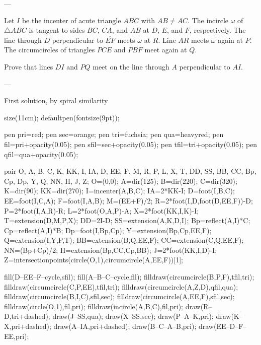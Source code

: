 
---

Let $I$ be the incenter of acute triangle $ABC$ with $AB\neq AC$. The incircle $\omega$ of $\triangle ABC$ is tangent to sides $BC$, $CA$, and $AB$ at $D$, $E$, and $F$, respectively. The line through $D$ perpendicular to $\overline{EF}$ meets $\omega$ at $R$. Line $AR$ meets $\omega$ again at $P$. The circumcircles of triangles $PCE$ and $PBF$ meet again at $Q$.

Prove that lines $DI$ and $PQ$ meet on the line through $A$ perpendicular to $AI$.

---

\begin{customenv}{First solution, by spiral similarity}\
    \begin{center}
        \begin{asy}
            size(11cm);
            defaultpen(fontsize(9pt));

            pen pri=red;
            pen sec=orange;
            pen tri=fuchsia;
            pen qua=heavyred;
            pen fil=pri+opacity(0.05);
            pen sfil=sec+opacity(0.05);
            pen tfil=tri+opacity(0.05);
            pen qfil=qua+opacity(0.05);

            pair O, A, B, C, K, KK, I, IA, D, EE, F, M, R, P, L, X, T, DD, SS, BB, CC, Bp, Cp, Dp, Y, Q, NN, H, J, Z;
            O=(0,0);
            A=dir(125);
            B=dir(220);
            C=dir(320);
            K=dir(90);
            KK=dir(270);
            I=incenter(A,B,C);
            IA=2*KK-I;
            D=foot(I,B,C);
            EE=foot(I,C,A);
            F=foot(I,A,B);
            M=(EE+F)/2;
            R=2*foot(I,D,foot(D,EE,F))-D;
            P=2*foot(I,A,R)-R;
            L=2*foot(O,A,P)-A;
            X=2*foot(KK,I,K)-I;
            T=extension(D,M,P,X);
            DD=2I-D;
            SS=extension(A,K,D,I);
            Bp=reflect(A,I)*C;
            Cp=reflect(A,I)*B;
            Dp=foot(I,Bp,Cp);
            Y=extension(Bp,Cp,EE,F);
            Q=extension(I,Y,P,T);
            BB=extension(B,Q,EE,F);
            CC=extension(C,Q,EE,F);
            NN=(Bp+Cp)/2;
            H=extension(Bp,CC,Cp,BB);
            J=2*foot(KK,I,D)-I;
            Z=intersectionpoints(circle(O,1),circumcircle(A,EE,F))[1];

            fill(D--EE--F--cycle,sfil);
            fill(A--B--C--cycle,fil);
            filldraw(circumcircle(B,P,F),tfil,tri);
            filldraw(circumcircle(C,P,EE),tfil,tri);
            filldraw(circumcircle(A,Z,D),qfil,qua);
            filldraw(circumcircle(B,I,C),sfil,sec);
            filldraw(circumcircle(A,EE,F),sfil,sec);
            filldraw(circle(O,1),fil,pri);
            filldraw(incircle(A,B,C),fil,pri);
            draw(R--D,tri+dashed);
            draw(J--SS,qua);
            draw(X--SS,sec);
            draw(P--A--K,pri);
            draw(K--X,pri+dashed);
            draw(A--IA,pri+dashed);
            draw(B--C--A--B,pri);
            draw(EE--D--F--EE,pri);


\end{asy}
\end{center}
\end{customenv}
